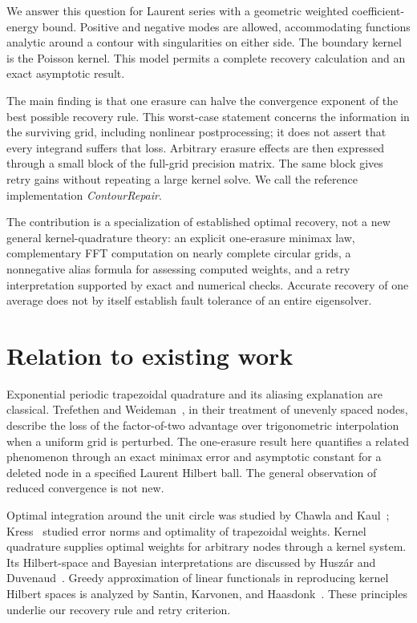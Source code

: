 \documentclass[final,leqno,letterpaper]{etna}
\begin{document}
We answer this question for Laurent series with a geometric weighted coefficient-energy bound. Positive and negative modes are allowed, accommodating functions analytic around a contour with singularities on either side. The boundary kernel is the Poisson kernel. This model permits a complete recovery calculation and an exact asymptotic result.

The main finding is that one erasure can halve the convergence exponent of the best possible recovery rule. This worst-case statement concerns the information in the surviving grid, including nonlinear postprocessing; it does not assert that every integrand suffers that loss. Arbitrary erasure effects are then expressed through a small block of the full-grid precision matrix. The same block gives retry gains without repeating a large kernel solve. We call the reference implementation \emph{ContourRepair}.

The contribution is a specialization of established optimal recovery, not a new general kernel-quadrature theory: an explicit one-erasure minimax law, complementary FFT computation on nearly complete circular grids, a nonnegative alias formula for assessing computed weights, and a retry interpretation supported by exact and numerical checks. Accurate recovery of one average does not by itself establish fault tolerance of an entire eigensolver.

\FloatBarrier
\section{Relation to existing work}
Exponential periodic trapezoidal quadrature and its aliasing explanation are classical. Trefethen and Weideman~\cite{TW14}, in their treatment of unevenly spaced nodes, describe the loss of the factor-of-two advantage over trigonometric interpolation when a uniform grid is perturbed. The one-erasure result here quantifies a related phenomenon through an exact minimax error and asymptotic constant for a deleted node in a specified Laurent Hilbert ball. The general observation of reduced convergence is not new.

Optimal integration around the unit circle was studied by Chawla and Kaul~\cite{CK73}; Kress~\cite{Kress78} studied error norms and optimality of trapezoidal weights. Kernel quadrature supplies optimal weights for arbitrary nodes through a kernel system. Its Hilbert-space and Bayesian interpretations are discussed by Husz\'ar and Duvenaud~\cite{HD12}. Greedy approximation of linear functionals in reproducing kernel Hilbert spaces is analyzed by Santin, Karvonen, and Haasdonk~\cite{SKH}. These principles underlie our recovery rule and retry criterion.
\end{document}
